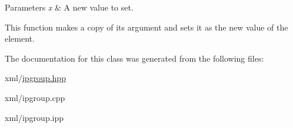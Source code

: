 \begin{DoxyParams}{Parameters}
{\em x} & A new value to set.\\
\hline
\end{DoxyParams}
This function makes a copy of its argument and sets it as the new value of the element. 

The documentation for this class was generated from the following files:\begin{DoxyCompactItemize}
\item 
xml/\hyperlink{ipgroup_8hpp}{ipgroup.hpp}\item 
xml/ipgroup.cpp\item 
xml/ipgroup.ipp\end{DoxyCompactItemize}
